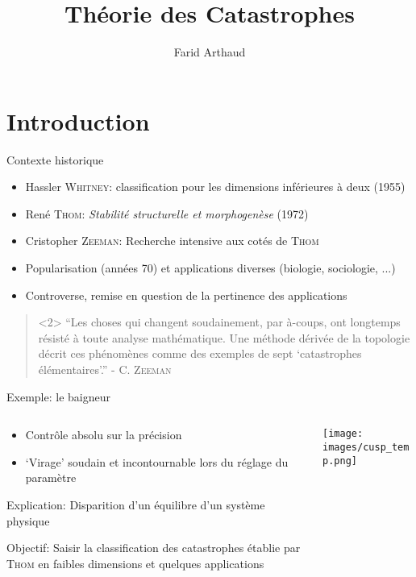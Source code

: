 \documentclass[compress, usepdftitle=false]{beamer}
\author{Farid Arthaud}
\title{Théorie des Catastrophes}
\date{}
\institute{TIPE 2018}
\theoremstyle{definition}
\begin{document}
\section*{Introduction}

\frame{\titlepage}

\frame{\tableofcontents}

\begin{frame}{Contexte historique}
    \begin{itemize}
        \item Hassler \textsc{Whitney}: classification pour les dimensions inférieures à deux (1955)
        \item René \textsc{Thom}: \textit{Stabilité structurelle et morphogenèse} (1972)
        \item Cristopher \textsc{Zeeman}: Recherche intensive aux cotés de \textsc{Thom}
        \item Popularisation (années 70) et applications diverses (biologie, sociologie, ...)
        \item Controverse, remise en question de la pertinence des applications
    \end{itemize}
    \begin{quote}<2>
        ``Les choses qui changent soudainement, par à-coups, ont longtemps résisté à toute analyse mathématique.
        Une méthode dérivée de la topologie décrit ces phénomènes comme des exemples de sept `catastrophes élémentaires'.'' - C. \textsc{Zeeman}
    \end{quote}
\end{frame}

\begin{frame}{Exemple: le baigneur}
    \begin{columns}[T]
        \begin{column}{5cm}
            \begin{itemize}[<+->]
                \item Contrôle absolu sur la précision
                \item `Virage' soudain et incontournable lors du réglage du paramètre
            \end{itemize}

            \pause[3]
            \alert{Explication}: Disparition d'un équilibre d'un système physique

            \pause
            \alert{Objectif}: Saisir la classification des catastrophes établie par \textsc{Thom} en faibles dimensions et quelques applications
        \end{column}
        \begin{column}{5cm}
            \texttt{[image: images/cusp\_temp.png]}
        \end{column}
    \end{columns}
\end{frame}
\end{document}
